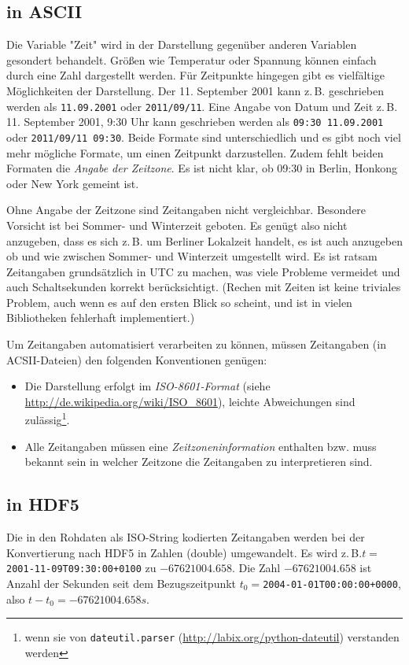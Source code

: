 \documentclass[version=last,
	a4paper,			%
	pagesize, 			%
	11pt,				%
	BCOR1cm,			%
	DIV12,	 			%
	pointlessnumbers,   %
	halfparskip,		%
]{scrreprt}
\newcommand{\zb}{z.\,B.\xspace}
\begin{document}
\subsection{in ASCII}
Die Variable "Zeit" wird in der Darstellung gegenüber anderen Variablen gesondert behandelt. Größen wie Temperatur oder Spannung können einfach durch eine Zahl dargestellt werden. Für Zeitpunkte hingegen gibt es vielfältige Möglichkeiten der Darstellung. Der 11. September 2001 kann \zb geschrieben werden als \texttt{11.09.2001} oder \texttt{2011/09/11}. Eine Angabe von Datum und Zeit \zb 11. September 2001, 9:30 Uhr kann geschrieben werden als \texttt{09:30 11.09.2001} oder \texttt{2011/09/11 09:30}. Beide Formate sind unterschiedlich und es gibt noch viel mehr mögliche Formate, um einen Zeitpunkt darzustellen. Zudem fehlt beiden Formaten die \emph{Angabe der Zeitzone}. Es ist nicht klar, ob 09:30 in Berlin, Honkong oder New York gemeint ist.

Ohne Angabe der Zeitzone sind Zeitangaben nicht vergleichbar. Besondere Vorsicht ist bei Sommer- und Winterzeit geboten. Es genügt also nicht anzugeben, dass es sich \zb um Berliner Lokalzeit handelt, es ist auch anzugeben ob und wie zwischen Sommer- und Winterzeit umgestellt wird. Es ist ratsam Zeitangaben grundsätzlich in UTC zu machen, was viele Probleme vermeidet und auch Schaltsekunden korrekt berücksichtigt. (Rechen mit Zeiten ist keine triviales Problem, auch wenn es auf den ersten Blick so scheint, und ist in vielen Bibliotheken fehlerhaft implementiert.)

Um Zeitangaben automatisiert verarbeiten zu können, müssen Zeitangaben (in ACSII-Dateien) den folgenden Konventionen genügen:
\begin{itemize}
  \item Die Darstellung erfolgt im \emph{ISO-8601-Format} (siehe \url{http://de.wikipedia.org/wiki/ISO_8601}), leichte Abweichungen sind zulässig\footnote{wenn sie von \texttt{dateutil.parser} (\url{http://labix.org/python-dateutil}) verstanden werden}.
  \item Alle Zeitangaben müssen eine \emph{Zeitzoneninformation} enthalten bzw. muss bekannt sein in welcher Zeitzone die Zeitangaben zu interpretieren sind.
\end{itemize}

\subsection{in HDF5}
Die in den Rohdaten als ISO-String kodierten Zeitangaben werden bei der Konvertierung nach HDF5 in Zahlen (double) umgewandelt. Es wird \zb $t=$\texttt{2001-11-09T09:30:00+0100} zu $-67621004.658$. Die Zahl $-67621004.658$ ist Anzahl der Sekunden seit dem Bezugszeitpunkt $t_0=$\texttt{2004-01-01T00:00:00+0000}, also $t-t_0=-67621004.658\si{s}$.
\end{document}
